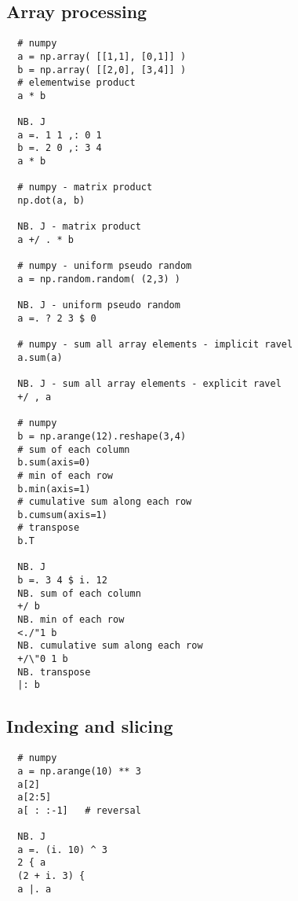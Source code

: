 \subsection*{Array processing}

\begin{verbatim}
  # numpy 
  a = np.array( [[1,1], [0,1]] ) 
  b = np.array( [[2,0], [3,4]] ) 
  # elementwise product 
  a * b

  NB. J 
  a =. 1 1 ,: 0 1 
  b =. 2 0 ,: 3 4 
  a * b

  # numpy - matrix product 
  np.dot(a, b)

  NB. J - matrix product 
  a +/ . * b    
  
  # numpy - uniform pseudo random 
  a = np.random.random( (2,3) )  
  
  NB. J - uniform pseudo random 
  a =. ? 2 3 $ 0  
  
  # numpy - sum all array elements - implicit ravel 
  a.sum(a)  
  
  NB. J - sum all array elements - explicit ravel 
  +/ , a  
  
  # numpy 
  b = np.arange(12).reshape(3,4) 
  # sum of each column 
  b.sum(axis=0) 
  # min of each row 
  b.min(axis=1) 
  # cumulative sum along each row 
  b.cumsum(axis=1) 
  # transpose 
  b.T     

  NB. J  
  b =. 3 4 $ i. 12 
  NB. sum of each column 
  +/ b 
  NB. min of each row 
  <./"1 b 
  NB. cumulative sum along each row 
  +/\"0 1 b 
  NB. transpose 
  |: b
\end{verbatim}

\subsection*{Indexing and slicing}

\begin{verbatim}
  # numpy  
  a = np.arange(10) ** 3  
  a[2] 
  a[2:5] 
  a[ : :-1]   # reversal

  NB. J 
  a =. (i. 10) ^ 3 
  2 { a 
  (2 + i. 3) { 
  a |. a
\end{verbatim}



%
 